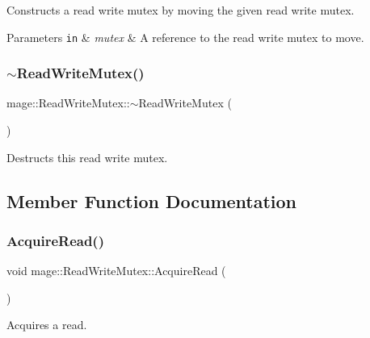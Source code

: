 Constructs a read write mutex by moving the given read write mutex.


\begin{DoxyParams}[1]{Parameters}
\mbox{\tt in}  & {\em mutex} & A reference to the read write mutex to move. \\
\hline
\end{DoxyParams}
\hypertarget{structmage_1_1_read_write_mutex_a73676d9414658d63edfe443ee1d55c8b}{}\label{structmage_1_1_read_write_mutex_a73676d9414658d63edfe443ee1d55c8b} 
\subsubsection{\texorpdfstring{$\sim$\+Read\+Write\+Mutex()}{~ReadWriteMutex()}}
{\footnotesize\ttfamily mage\+::\+Read\+Write\+Mutex\+::$\sim$\+Read\+Write\+Mutex (\begin{DoxyParamCaption}{ }\end{DoxyParamCaption})}

Destructs this read write mutex. 

\subsection{Member Function Documentation}
\hypertarget{structmage_1_1_read_write_mutex_af78045647078aaf3966c8f1b06e35c92}{}\label{structmage_1_1_read_write_mutex_af78045647078aaf3966c8f1b06e35c92} 
\subsubsection{\texorpdfstring{Acquire\+Read()}{AcquireRead()}}
{\footnotesize\ttfamily void mage\+::\+Read\+Write\+Mutex\+::\+Acquire\+Read (\begin{DoxyParamCaption}{ }\end{DoxyParamCaption})\hspace{0.3cm}{\ttfamily [private]}}

Acquires a read. \hypertarget{structmage_1_1_read_write_mutex_a76137013107a9c2c1fc05c1e0747965e}{}\label{structmage_1_1_read_write_mutex_a76137013107a9c2c1fc05c1e0747965e} 

